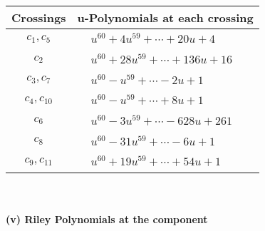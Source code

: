 \documentclass[1p]{elsarticle_modified}
\theoremstyle{definition}
\begin{document}
\begin{tabular}{m{50pt}|m{274pt}}
Crossings & \hspace{64pt}u-Polynomials at each crossing \\
\hline $$\begin{aligned}c_{1},c_{5}\end{aligned}$$&$\begin{aligned}
&u^{60}+4 u^{59}+\cdots+20 u+4
\end{aligned}$\\
\hline $$\begin{aligned}c_{2}\end{aligned}$$&$\begin{aligned}
&u^{60}+28 u^{59}+\cdots+136 u+16
\end{aligned}$\\
\hline $$\begin{aligned}c_{3},c_{7}\end{aligned}$$&$\begin{aligned}
&u^{60}- u^{59}+\cdots-2 u+1
\end{aligned}$\\
\hline $$\begin{aligned}c_{4},c_{10}\end{aligned}$$&$\begin{aligned}
&u^{60}- u^{59}+\cdots+8 u+1
\end{aligned}$\\
\hline $$\begin{aligned}c_{6}\end{aligned}$$&$\begin{aligned}
&u^{60}-3 u^{59}+\cdots-628 u+261
\end{aligned}$\\
\hline $$\begin{aligned}c_{8}\end{aligned}$$&$\begin{aligned}
&u^{60}-31 u^{59}+\cdots-6 u+1
\end{aligned}$\\
\hline $$\begin{aligned}c_{9},c_{11}\end{aligned}$$&$\begin{aligned}
&u^{60}+19 u^{59}+\cdots+54 u+1
\end{aligned}$\\
\hline
\end{tabular}\\~\\
\newpage\renewcommand{\arraystretch}{1}
\flushleft \textbf{(v) Riley Polynomials at the component}\newline \\
\end{document}
